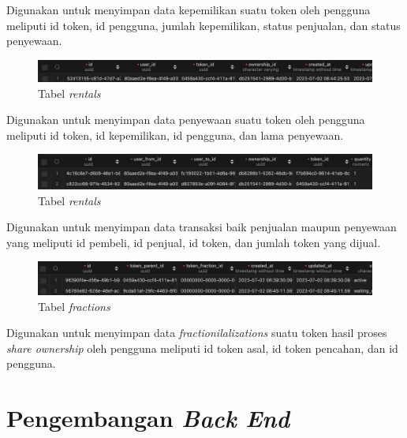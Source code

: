 Digunakan untuk menyimpan data kepemilikan suatu token oleh pengguna meliputi id token, id pengguna, jumlah kepemilikan, status penjualan, dan status penyewaan.

\begin{figure} [H] \centering
  \includegraphics[scale=0.35]{gambar/img-table-rentals.png}
  \caption{Tabel \emph{rentals}}
  \label{fig:OwnershipTable}
\end{figure}

Digunakan untuk menyimpan data penyewaan suatu token oleh pengguna meliputi id token, id kepemilikan, id pengguna, dan lama penyewaan.

\begin{figure} [H] \centering
  \includegraphics[scale=0.35]{gambar/img-table-transactions.png}
  \caption{Tabel \emph{rentals}}
  \label{fig:TransactionsTable}
\end{figure}

Digunakan untuk menyimpan data transaksi baik penjualan maupun penyewaan yang meliputi id pembeli, id penjual, id token, dan jumlah token yang dijual.

\begin{figure} [H] \centering
  \includegraphics[scale=0.35]{gambar/img-table-fractions.png}
  \caption{Tabel \emph{fractions}}
  \label{fig:FractionsTable}
\end{figure}

Digunakan untuk menyimpan data \emph{fractionilalizations} suatu token hasil proses \emph{share ownership} oleh pengguna meliputi id token asal, id token pencahan, dan id pengguna.

\section{Pengembangan \emph{Back End}} 

